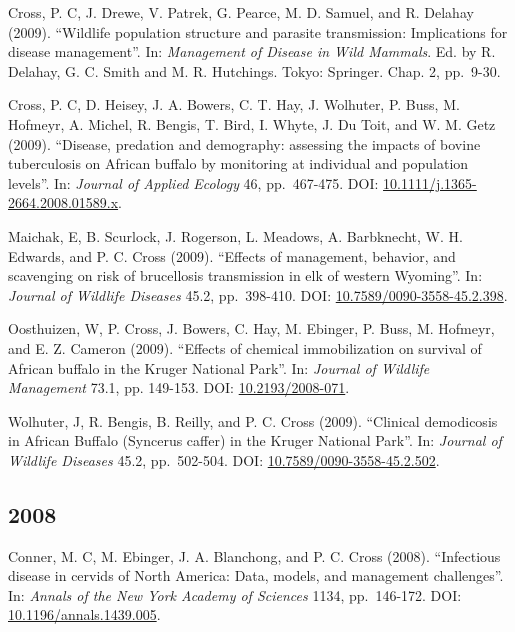 \documentclass[12pt,]{article}
\begin{document}
Cross, P. C, J. Drewe, V. Patrek, G. Pearce, M. D. Samuel, and R.
Delahay (2009). ``Wildlife population structure and parasite
transmission: Implications for disease management''. In:
\emph{Management of Disease in Wild Mammals}. Ed. by R. Delahay, G. C.
Smith and M. R. Hutchings. Tokyo: Springer. Chap. 2, pp.~9-30.

Cross, P. C, D. Heisey, J. A. Bowers, C. T. Hay, J. Wolhuter, P. Buss,
M. Hofmeyr, A. Michel, R. Bengis, T. Bird, I. Whyte, J. Du Toit, and W.
M. Getz (2009). ``Disease, predation and demography: assessing the
impacts of bovine tuberculosis on African buffalo by monitoring at
individual and population levels''. In: \emph{Journal of Applied
Ecology} 46, pp.~467-475. DOI:
\href{https://doi.org/10.1111\%2Fj.1365-2664.2008.01589.x}{10.1111/j.1365-2664.2008.01589.x}.

Maichak, E, B. Scurlock, J. Rogerson, L. Meadows, A. Barbknecht, W. H.
Edwards, and P. C. Cross (2009). ``Effects of management, behavior, and
scavenging on risk of brucellosis transmission in elk of western
Wyoming''. In: \emph{Journal of Wildlife Diseases} 45.2, pp.~398-410.
DOI:
\href{https://doi.org/10.7589\%2F0090-3558-45.2.398}{10.7589/0090-3558-45.2.398}.

Oosthuizen, W, P. Cross, J. Bowers, C. Hay, M. Ebinger, P. Buss, M.
Hofmeyr, and E. Z. Cameron (2009). ``Effects of chemical immobilization
on survival of African buffalo in the Kruger National Park''. In:
\emph{Journal of Wildlife Management} 73.1, pp. 149-153. DOI:
\href{https://doi.org/10.2193\%2F2008-071}{10.2193/2008-071}.

Wolhuter, J, R. Bengis, B. Reilly, and P. C. Cross (2009). ``Clinical
demodicosis in African Buffalo (Syncerus caffer) in the Kruger National
Park''. In: \emph{Journal of Wildlife Diseases} 45.2, pp.~502-504. DOI:
\href{https://doi.org/10.7589\%2F0090-3558-45.2.502}{10.7589/0090-3558-45.2.502}.

\hypertarget{section-11}{%
\subsection{2008}\label{section-11}}

Conner, M. C, M. Ebinger, J. A. Blanchong, and P. C. Cross (2008).
``Infectious disease in cervids of North America: Data, models, and
management challenges''. In: \emph{Annals of the New York Academy of
Sciences} 1134, pp.~146-172. DOI:
\href{https://doi.org/10.1196\%2Fannals.1439.005}{10.1196/annals.1439.005}.
\end{document}
